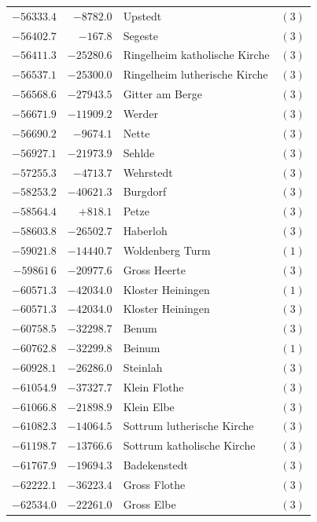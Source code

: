 \begin{center}
\begin{tabular}{r|r|p{170pt}|r}
\(-56333.4\)&\(-8782.0\)&Upstedt&\((3)\)\\
\(-56402.7\)&\(-167.8\)&Segeste&\((3)\)\\
\(-56411.3\)&\(-25280.6\)&Ringelheim katholische Kirche&\((3)\)\\
\(-56537.1\)&\(-25300.0\)&Ringelheim lutherische Kirche&\((3)\)\\
\(-56568.6\)&\(-27943.5\)&Gitter am Berge&\((3)\)\\
\(-56671.9\)&\(-11909.2\)&Werder&\((3)\)\\
\(-56690.2\)&\(-9674.1\)&Nette&\((3)\)\\
\(-56927.1\)&\(-21973.9\)&Sehlde&\((3)\)\\
\(-57255.3\)&\(-4713.7\)&Wehrstedt&\((3)\)\\
\(-58253.2\)&\(-40621.3\)&Burgdorf&\((3)\)\\
\(-58564.4\)&\(+818.1\)&Petze&\((3)\)\\
\(-58603.8\)&\(-26502.7\)&Haberloh&\((3)\)\\
\(-59021.8\)&\(-14440.7\)&Woldenberg Turm&\((1)\)\\
\(-59861\,6\)&\(-20977.6\)&Gross Heerte&\((3)\)\\
\(-60571.3\)&\(-42034.0\)&Kloster Heiningen&\((1)\)\\
\(-60571.3\)&\(-42034.0\)&Kloster Heiningen&\((3)\)\\
\(-60758.5\)&\(-32298.7\)&Benum&\((3)\)\\
\(-60762.8\)&\(-32299.8\)&Beinum&\((1)\)\\
\(-60928.1\)&\(-26286.0\)&Steinlah&\((3)\)\\
\(-61054.9\)&\(-37327.7\)&Klein Flothe&\((3)\)\\
\(-61066.8\)&\(-21898.9\)&Klein Elbe&\((3)\)\\
\(-61082.3\)&\(-14064.5\)&Sottrum lutherische Kirche&\((3)\)\\
\(-61198.7\)&\(-13766.6\)&Sottrum katholische Kirche&\((3)\)\\
\(-61767.9\)&\(-19694.3\)&Badekenstedt&\((3)\)\\
\(-62222.1\)&\(-36223.4\)&Gross Flothe&\((3)\)\\
\(-62534.0\)&\(-22261.0\)&Gross Elbe&\((3)\)\\
\hline\end{tabular}\endgroup\end{center}
